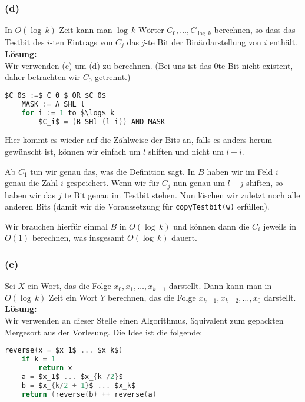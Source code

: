 \documentclass[11pt,a4paper,ngerman]{article}
\begin{document}
\subsubsection*{(d)}
In $O(\log \, k )$ Zeit kann man $\log \, k$ Wörter $C_0, \ldots, C_{\log \, k}$ berechnen, so dass das Testbit des $i$-ten Eintrags von $C_j$ das $j$-te Bit der Binärdarstellung von $i$ enthält.\\

\noindent\textbf{Lösung:}\\

Wir verwenden (c) um (d) zu berechnen. (Bei uns ist das $0$te Bit nicht existent, daher betrachten wir $C_0$ getrennt.)

\begin{lstlisting}[frame=single,language=C, morekeywords={:=,SHR,SHL,NOT,XOR,AND,OR,MUL}]
	$C_0$ :=$ C_0 $ OR $C_0$
	MASK := A SHL l
	for i := 1 to $\log$ k
		$C_i$ = (B SHl (l-i)) AND MASK
\end{lstlisting}

Hier kommt es wieder auf die Zählweise der Bits an, falls es anders herum gewünscht ist, können wir einfach um $l$ shiften und nicht um $l-i$.

Ab $C_1$ tun wir genau das, was die Definition sagt. In $B$ haben wir im Feld $i$ genau die Zahl $i$ gespeichert. Wenn wir für $C_j$ nun genau um $l-j$ shiften, so haben wir das $j$ te Bit genau im Testbit stehen. Nun löschen wir zuletzt noch alle anderen Bits (damit wir die Voraussetzung für
\lstinline|copyTestbit(w)| erfüllen).

Wir brauchen hierfür einmal $B$ in $O(\log \, k)$ und können dann die $C_i$ jeweils in $O(1)$ berechnen, was insgesamt $O(\log \, k)$ dauert.

\subsubsection*{(e)}
Sei $X$ ein Wort, das die Folge $x_0, x_1, \ldots, x_{k-1}$ darstellt. Dann kann man in $O(\log \, k)$ Zeit ein Wort $Y$ berechnen, das die Folge $x_{k-1}, x_{k-2}, \ldots, x_0$ darstellt.\\

\noindent\textbf{Lösung:}\\

Wir verwenden an dieser Stelle einen Algorithmus, äquivalent zum gepackten Mergesort aus der Vorlesung. Die Idee ist die folgende:
\begin{lstlisting}[frame=single,language=C]
reverse(x = $x_1$ ... $x_k$)
	if k = 1
		return x
	a = $x_1$ ... $x_{k /2}$
	b = $x_{k/2 + 1}$ ... $x_k$
	return (reverse(b) ++ reverse(a)
\end{lstlisting}
\end{document}
